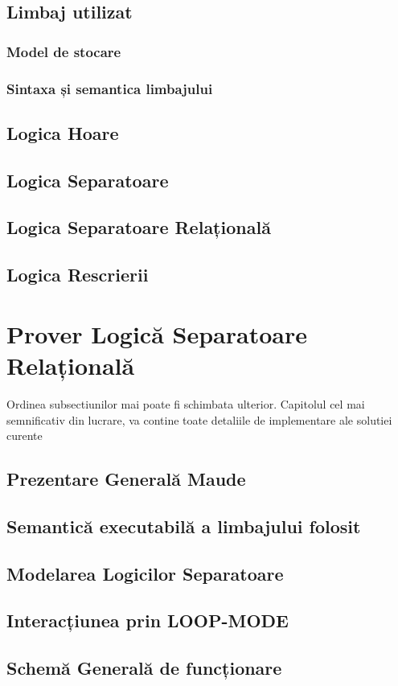 \documentclass[12pt,a4paper]{article}
\begin{document}
\subsection{Limbaj utilizat}
\subsubsection{Model de stocare}
\subsubsection{Sintaxa și semantica limbajului}
\subsection{Logica Hoare}
\subsection{Logica Separatoare}
\subsection{Logica Separatoare Relațională}
\subsection{Logica Rescrierii}
\section{Prover Logică Separatoare Relațională}
Ordinea subsectiunilor mai poate fi schimbata ulterior. Capitolul cel mai semnificativ din lucrare, va contine toate detaliile de implementare ale solutiei curente
\subsection{Prezentare Generală Maude}
\subsection{Semantică executabilă a limbajului folosit}
\subsection{Modelarea Logicilor Separatoare}
\subsection{Interacțiunea prin LOOP-MODE}
\subsection{Schemă Generală de funcționare}
\end{document}
